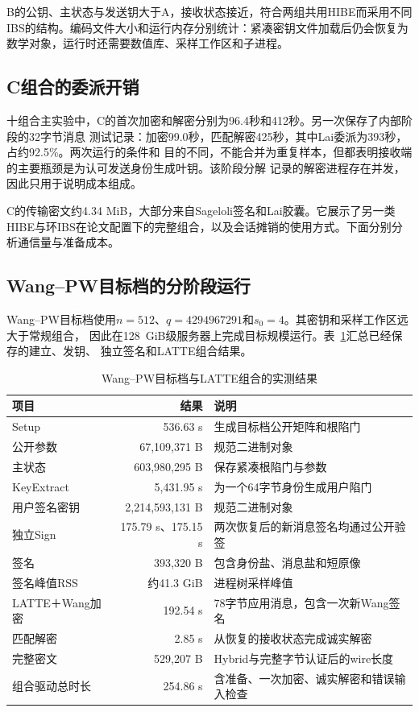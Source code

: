 B的公钥、主状态与发送钥大于A，接收状态接近，符合两组共用HIBE而采用不同IBS的结构。编码文件大小和运行内存分别统计：紧凑密钥文件加载后仍会恢复为数学对象，运行时还需要数值库、采样工作区和子进程。

\subsection{C组合的委派开销}
十组合主实验中，C的首次加密和解密分别为96.4秒和412秒。另一次保存了内部阶段的32字节消息
测试记录：加密99.0秒，匹配解密425秒，其中Lai委派为393秒，占约92.5\%。两次运行的条件和
目的不同，不能合并为重复样本，但都表明接收端的主要瓶颈是为认可发送身份生成叶钥。该阶段分解
记录的解密进程存在并发，因此只用于说明成本组成。

C的传输密文约4.34 MiB，大部分来自Sageloli签名和Lai胶囊。它展示了另一类HIBE与环IBS在论文配置下的完整组合，以及会话摊销的使用方式。下面分别分析通信量与准备成本。

\subsection{Wang--PW目标档的分阶段运行}

Wang--PW目标档使用$n=512$、$q=4294967291$和$s_0=4$。其密钥和采样工作区远大于常规组合，
因此在128~GiB级服务器上完成目标规模运行。表~\ref{tab:wang-results}汇总已经保存的建立、发钥、
独立签名和LATTE组合结果。

\begin{table}[H]
\centering\small
\caption{Wang--PW目标档与LATTE组合的实测结果}
\label{tab:wang-results}
\begin{tabularx}{\textwidth}{@{}p{}rX@{}}
\toprule
\rowcolor{black!8} 项目 & 结果 & 说明 \\
\midrule
Setup & 536.63 s & 生成目标档公开矩阵和根陷门 \\
公开参数 & 67,109,371 B & 规范二进制对象 \\
主状态 & 603,980,295 B & 保存紧凑根陷门与参数 \\
KeyExtract & 5,431.95 s & 为一个64字节身份生成用户陷门 \\
用户签名密钥 & 2,214,593,131 B & 规范二进制对象 \\
独立Sign & 175.79 s、175.15 s & 两次恢复后的新消息签名均通过公开验签 \\
签名 & 393,320 B & 包含身份盐、消息盐和短原像 \\
签名峰值RSS & 约41.3 GiB & 进程树采样峰值 \\
LATTE＋Wang加密 & 192.54 s & 78字节应用消息，包含一次新Wang签名 \\
匹配解密 & 2.85 s & 从恢复的接收状态完成诚实解密 \\
完整密文 & 529,207 B & Hybrid与完整字节认证后的wire长度 \\
组合驱动总时长 & 254.86 s & 含准备、一次加密、诚实解密和错误输入检查 \\
\bottomrule
\end{tabularx}
\end{table}

